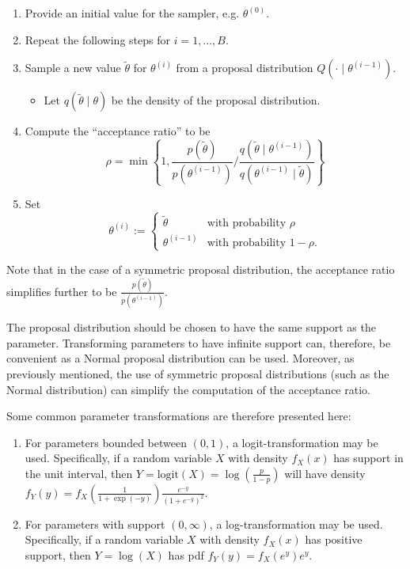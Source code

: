 \documentclass[12pt]{article}
\providecommand{\tightlist}{%
  \setlength{\itemsep}{0pt}\setlength{\parskip}{0pt}}
\newcommand{\p}[1]{\left(#1\right)}
\newcommand{\bc}[1]{ \left\{#1\right\} }
\def\logit{\text{logit}}
\begin{document}
\begin{enumerate}
\def\labelenumi{\arabic{enumi}.}
\tightlist
\item
  Provide an initial value for the sampler, e.g. $\theta^{(0)}$.
\item
  Repeat the following steps for $i = 1,...,B$.
\item
  Sample a new value $\tilde\theta$ for $\theta^{(i)}$ from a
  proposal distribution $Q(\cdot \mid \theta^{(i-1)})$.

  \begin{itemize}
  \tightlist
  \item
    Let $q(\tilde\theta \mid \theta)$ be the density of the proposal
    distribution.
  \end{itemize}
\item
  Compute the ``acceptance ratio'' to be $$
     \rho=
     \min\bc{1, \frac{p(\tilde\theta)}{p(\theta^{(i-1)})} \Big/ 
            \frac{q(\tilde\theta\mid\theta^{(i-1)})}
                 {q(\theta^{(i-1)}\mid\tilde\theta)}
        }
     $$
\item
  Set $$
     \theta^{(i)} := 
     \begin{cases}
     \tilde\theta &\text{with probability } \rho \\
     \theta^{(i-1)} &\text{with probability } 1-\rho.
     \end{cases}
     $$
\end{enumerate}

Note that in the case of a symmetric proposal distribution, the
acceptance ratio simplifies further to be
$\frac{p(\tilde\theta)}{p(\theta^{(i-1)})}$.

The proposal distribution should be chosen to have the same support as
the parameter. Transforming parameters to have infinite support can,
therefore, be convenient as a Normal proposal distribution can be used.
Moreover, as previously mentioned, the use of symmetric proposal
distributions (such as the Normal distribution) can simplify the
computation of the acceptance ratio.

Some common parameter transformations are therefore presented here:

\begin{enumerate}
\def\labelenumi{\arabic{enumi}.}
\tightlist
\item
  For parameters bounded between $(0,1)$, a logit-transformation may
  be used. Specifically, if a random variable $X$ with density
  $f_X(x)$ has support in the unit interval, then
  $Y=\logit(X)=\log\p{\frac{p}{1-p}}$ will have density
  $f_Y(y) = f_X\p{\frac{1}{1+\exp(-y)}}\frac{e^{-y}}{(1+e^{-y})^{2}}$.
\item
  For parameters with support $(0,\infty)$, a log-transformation may
  be used. Specifically, if a random variable $X$ with density
  $f_X(x)$ has positive support, then $Y = \log(X)$ has pdf
  $f_Y(y) = f_X(e^y) e^y$.
\end{enumerate}
\end{document}
